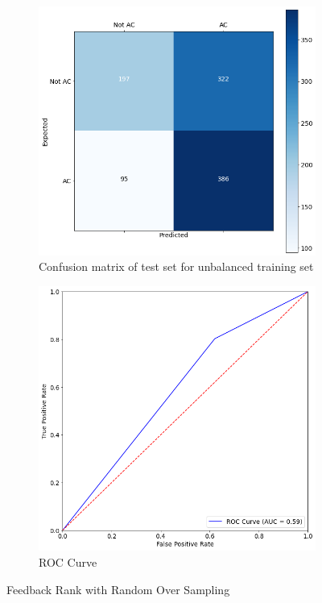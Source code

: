 \begin{figure}[H]
	\begin{subfigure}{0.5\textwidth}
		\centering
		\includegraphics[scale=0.3]{./src/fbRank/fbrank_ro_cm.png}
		\caption{Confusion matrix of test set for unbalanced training set}\label{}
	\end{subfigure}%
	\begin{subfigure}{0.5\textwidth}
	\centering
	\includegraphics[scale=0.28]{./src/fbRank/fbrank_ro_roc.png}
	\caption{ROC Curve}\label{}
	\end{subfigure}
	\caption{Feedback Rank with Random Over Sampling}
	\label{results:metrics_fbrank}
\end{figure}


